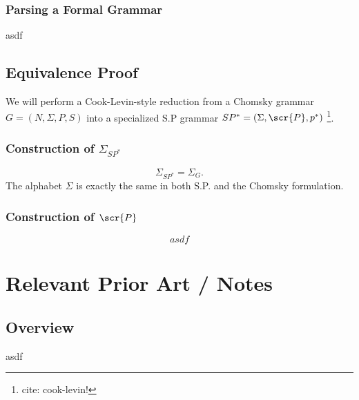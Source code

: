 \documentclass[10pt]{article}
\newcommand{\todocite}[1]{\footnote{cite: #1}}
\begin{document}
\subsubsection{Parsing a Formal Grammar}
\label{sec:proof-of-parsing-a-formal-grammar}
asdf

\subsection{Equivalence Proof}
\label{sec:equivalence-proof}
We will perform a Cook-Levin-style reduction from a Chomsky grammar $G = (N, \Sigma, P, S)$  into a specialized S.P grammar $SP^* = (\Sigma, \scr{P}, p^*)$  \todocite{cook-levin!}.

\subsubsection{Construction of $\Sigma_{SP^*}$}
\label{sec:construction-of-sigma}
\begin{equation}\label{eq:alphabet}
  \Sigma_{SP^*} = \Sigma_G.
\end{equation}
The alphabet $\Sigma$ is exactly the same in both S.P. and the Chomsky formulation.

\subsubsection{Construction of $\scr{P}$}
\label{sec:construction-of-p}
\begin{equation}
  \label{eq:productions-reduction}
  asdf
\end{equation}

\section{Relevant Prior Art / Notes}
\subsection{Overview}
\label{sec:overview}

asdf
\end{document}
